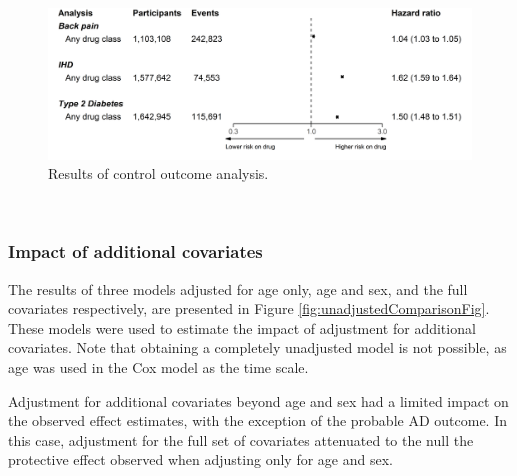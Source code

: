 \documentclass[a4paper, twoside]{templates/ociamthesis}
\begin{document}
~





\begin{figure}[H]
\includegraphics[width=1\linewidth]{figures/cprd-analysis/forester_control_outcomes} \caption[Results of control outcome analysis]{Results of control outcome analysis.}\label{fig:controlOutcomeFig}
\end{figure}

~

\hypertarget{cprd-impact-additional-covar}{%
\subsubsection{Impact of additional covariates}\label{cprd-impact-additional-covar}}

The results of three models adjusted for age only, age and sex, and the full covariates respectively, are presented in Figure \ref{fig:unadjustedComparisonFig}. These models were used to estimate the impact of adjustment for additional covariates. Note that obtaining a completely unadjusted model is not possible, as age was used in the Cox model as the time scale.

Adjustment for additional covariates beyond age and sex had a limited impact on the observed effect estimates, with the exception of the probable AD outcome. In this case, adjustment for the full set of covariates attenuated to the null the protective effect observed when adjusting only for age and sex.

~
\end{document}
